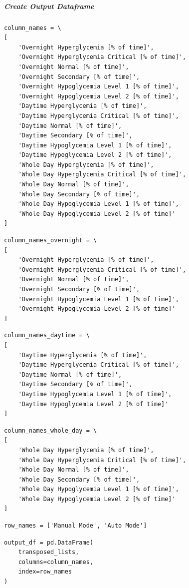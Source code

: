 \subparagraph{Create Output Dataframe}

\begin{verbatim}
column_names = \
[
    'Overnight Hyperglycemia [% of time]',
    'Overnight Hyperglycemia Critical [% of time]',
    'Overnight Normal [% of time]',
    'Overnight Secondary [% of time]',
    'Overnight Hypoglycemia Level 1 [% of time]',
    'Overnight Hypoglycemia Level 2 [% of time]',
    'Daytime Hyperglycemia [% of time]',
    'Daytime Hyperglycemia Critical [% of time]',
    'Daytime Normal [% of time]',
    'Daytime Secondary [% of time]',
    'Daytime Hypoglycemia Level 1 [% of time]',
    'Daytime Hypoglycemia Level 2 [% of time]',
    'Whole Day Hyperglycemia [% of time]',
    'Whole Day Hyperglycemia Critical [% of time]',
    'Whole Day Normal [% of time]',
    'Whole Day Secondary [% of time]',
    'Whole Day Hypoglycemia Level 1 [% of time]',
    'Whole Day Hypoglycemia Level 2 [% of time]'
]
\end{verbatim}

\begin{verbatim}
column_names_overnight = \
[
    'Overnight Hyperglycemia [% of time]',
    'Overnight Hyperglycemia Critical [% of time]',
    'Overnight Normal [% of time]',
    'Overnight Secondary [% of time]',
    'Overnight Hypoglycemia Level 1 [% of time]',
    'Overnight Hypoglycemia Level 2 [% of time]'
]
\end{verbatim}

\begin{verbatim}
column_names_daytime = \
[
    'Daytime Hyperglycemia [% of time]',
    'Daytime Hyperglycemia Critical [% of time]',
    'Daytime Normal [% of time]',
    'Daytime Secondary [% of time]',
    'Daytime Hypoglycemia Level 1 [% of time]',
    'Daytime Hypoglycemia Level 2 [% of time]'
]
\end{verbatim}

\begin{verbatim}
column_names_whole_day = \
[
    'Whole Day Hyperglycemia [% of time]',
    'Whole Day Hyperglycemia Critical [% of time]',
    'Whole Day Normal [% of time]',
    'Whole Day Secondary [% of time]',
    'Whole Day Hypoglycemia Level 1 [% of time]',
    'Whole Day Hypoglycemia Level 2 [% of time]'
]
\end{verbatim}

\begin{verbatim}
row_names = ['Manual Mode', 'Auto Mode']
\end{verbatim}

\begin{verbatim}
output_df = pd.DataFrame(
    transposed_lists,
    columns=column_names,
    index=row_names
)
\end{verbatim}

